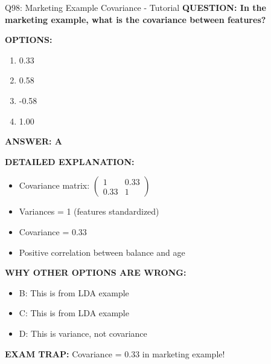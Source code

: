 \documentclass[8pt]{beamer}
\begin{document}
	\begin{frame}{Q98: Marketing Example Covariance - Tutorial}
		\fontsize{6.5}{7.5}\selectfont
		\textbf{QUESTION: In the marketing example, what is the covariance between features?}
		
		\vspace{0.1cm}
		\textbf{OPTIONS:}
		\begin{enumerate}
			\item 0.33
			\item 0.58
			\item -0.58
			\item 1.00
		\end{enumerate}
		
		\vspace{0.1cm}
		\textcolor{myblue}{\textbf{ANSWER: A}}
		
		\vspace{0.1cm}
		\textbf{DETAILED EXPLANATION:}
		\begin{itemize}
			\item Covariance matrix: $\begin{pmatrix} 1 & 0.33 \\ 0.33 & 1 \end{pmatrix}$
			\item Variances = 1 (features standardized)
			\item Covariance = 0.33
			\item Positive correlation between balance and age
		\end{itemize}
		
		\vspace{0.1cm}
		\textcolor{myred}{\textbf{WHY OTHER OPTIONS ARE WRONG:}}
		\begin{itemize}
			\item \textcolor{myred}{B:} This is from LDA example
			\item \textcolor{myred}{C:} This is from LDA example
			\item \textcolor{myred}{D:} This is variance, not covariance
		\end{itemize}
		
		\textcolor{myred}{\textbf{EXAM TRAP:}} Covariance = \textcolor{myblue}{0.33} in marketing example!
	\end{frame}
	
\end{document}
